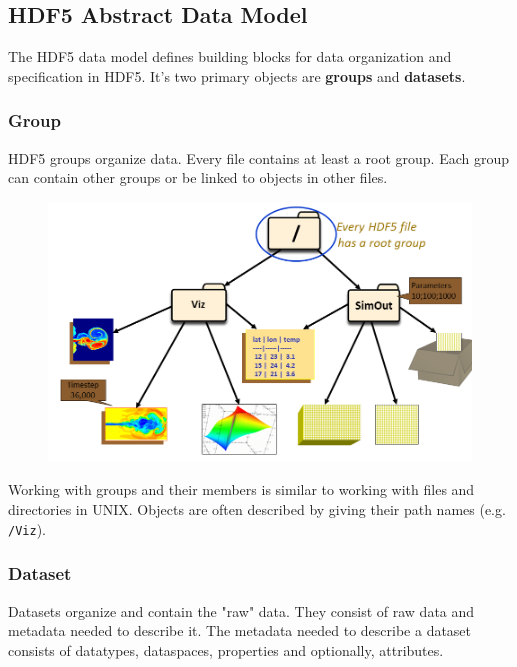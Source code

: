 \documentclass[thesis=M,english]{FITthesis}[2019/12/23]
\begin{document}
\subsection{HDF5 Abstract Data Model}

The HDF5 data model defines building blocks for data organization and specification in HDF5.
It's two primary objects are \textbf{groups} and \textbf{datasets}.

\subsubsection{Group}

HDF5 groups organize data. Every file contains at least a root group.
Each group can contain other groups or be linked to objects in other files.

\begin{figure}[!h]
    \centering
    \includegraphics[scale=0.3]{static/group.png}
\end{figure}

Working with groups and their members is similar to working with files and directories in UNIX.
Objects are often described by giving their path names (e.g. \texttt{/Viz}).

\subsubsection{Dataset}

Datasets organize and contain the "raw" data. They consist of raw data and metadata needed to describe it.
The metadata needed to describe a dataset consists of datatypes, dataspaces, properties and optionally,
attributes.
\end{document}
